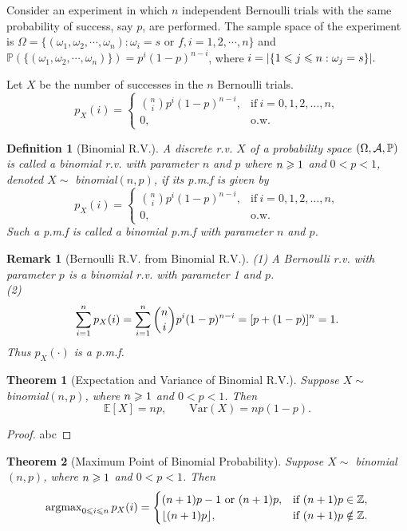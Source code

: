 \documentclass[openany,12pt]{book}
\newtheorem{theorem}{Theorem}[chapter]
\newtheorem{remark}{Remark}[chapter]
\newtheorem{definition}{Definition}[chapter]
\begin{document}
Consider an experiment in which $n$ independent Bernoulli trials with the same probability of success, say $p$, are performed. The sample space of the experiment is $\Omega=\{(\omega_1,\omega_2, \cdots,\omega_n): \omega_i=s \text{ or } f,i=1,2, \cdots,n\} $ and $\mathbb{P}(\{(\omega_1,\omega_2, \cdots,\omega_n)\})=p^i (1-p)^{n-i}$, where $i=|\{1\leqslant j\leqslant n: \omega_j=s\}|.$

Let $X$ be the number of successes in the $n$ Bernoulli trials.
$$
  p_X(i)=
  \begin{cases}
    \binom n i p^i(1-p)^{n-i},&\text{if}~i=0,1,2, \dots,n, \\
    0, &\text{o.w.}
  \end{cases}
$$

\begin{definition}[Binomial R.V.]
  A discrete r.v. $X$ of a probability space $(\Omega,\mathcal{A},\mathbb{P})$ is called a binomial r.v. with parameter $n$ and $p$ where $n\geqslant 1$ and $0<p<1$, denoted $X\sim$ binomial$(n,p)$, if its p.m.f is given by
  $$
    p_X(i)=
    \begin{cases}
      \binom n i p^i(1-p)^{n-i}, &\text{if}~i=0,1,2, \dots,n, \\
      0, &\text{o.w.}
    \end{cases}
  $$
  Such a p.m.f is called a binomial p.m.f with parameter $n$ and $p$.
\end{definition}

\begin{remark}[Bernoulli R.V. from Binomial R.V.]
  (1) A Bernoulli r.v. with parameter $p$ is a binomial r.v. with parameter 1 and $p$.\\
  (2)
  $$
    \sum_{i=1}^{n} p_X(i)=\sum_{i=1}^{n}\binom n i p^i(1-p)^{n-i}=[p+(1-p)]^n=1.
  $$
  Thus $p_X(\cdot)$ is a p.m.f.
\end{remark}

\begin{theorem}[Expectation and Variance of Binomial R.V.]
  Suppose $X\sim$ binomial$(n,p)$, where $n\geqslant1$ and $0<p<1$. Then
  $$\mathbb{E}[X]=np,\qquad \mathrm{Var}(X)=np(1-p).$$
\end{theorem}

\begin{proof}
  abc
\end{proof}

\begin{theorem}[Maximum Point of Binomial Probability]
  Suppose $X\sim$ binomial$(n,p)$, where $n\geqslant1$ and $0<p<1$. Then
  $$
    \operatorname{argmax}_{0\leqslant i\leqslant n} p_X(i)=
    \begin{cases}
      (n+1)p-1 \text{  or  } (n+1)p, &\text{if }  (n+1)p\in\mathbb{Z}, \\
      \lfloor(n+1)p\rfloor,  &\text{if }  (n+1)p\notin\mathbb{Z}.
    \end{cases}
  $$
\end{theorem}
\end{document}
